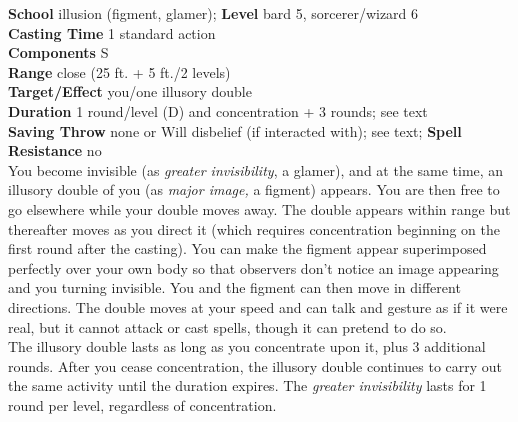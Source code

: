 \textbf{School} illusion (figment, glamer); \textbf{Level} bard 5, sorcerer/wizard 6\\
\textbf{Casting Time} 1 standard action\\
\textbf{Components} S\\
\textbf{Range} close (25 ft. + 5 ft./2 levels)\\
\textbf{Target/Effect} you/one illusory double\\
\textbf{Duration} 1 round/level (D) and concentration + 3 rounds; see text\\
\textbf{Saving Throw} none or Will disbelief (if interacted with); see text; \textbf{Spell Resistance} no\\
You become invisible (as \textit{greater invisibility}, a glamer), and at the same time, an illusory double of you (as \textit{major image, }a figment) appears. You are then free to go elsewhere while your double moves away. The double appears within range but thereafter moves as you direct it (which requires concentration beginning on the first round after the casting). You can make the figment appear superimposed perfectly over your own body so that observers don't notice an image appearing and you turning invisible. You and the figment can then move in different directions. The double moves at your speed and can talk and gesture as if it were real, but it cannot attack or cast spells, though it can pretend to do so.\\
The illusory double lasts as long as you concentrate upon it, plus 3 additional rounds. After you cease concentration, the illusory double continues to carry out the same activity until the duration expires. The \textit{greater invisibility }lasts for 1 round per level, regardless of concentration.\\
